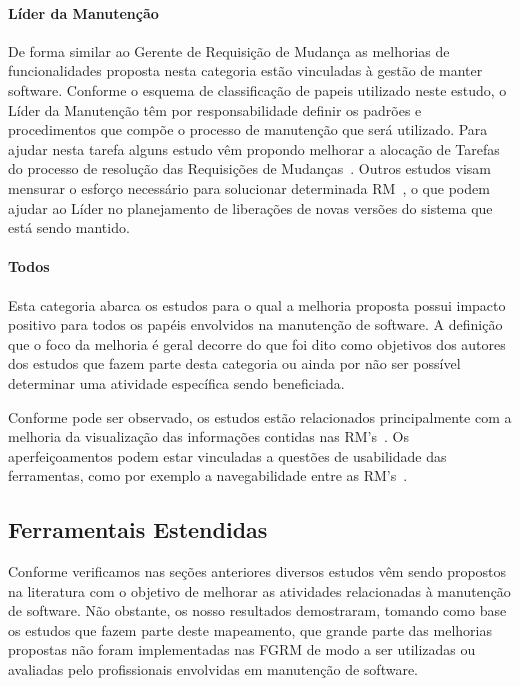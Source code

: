 \paragraph{Líder da Manutenção} De forma similar ao Gerente de Requisição de
Mudança as melhorias de funcionalidades proposta nesta categoria estão
vinculadas à gestão de manter software. Conforme o esquema de  classificação de
papeis utilizado neste estudo, o Líder da Manutenção têm por responsabilidade
definir os padrões e procedimentos que compõe o processo de manutenção que será
utilizado. Para ajudar nesta tarefa alguns estudo  vêm propondo melhorar a
alocação de Tarefas do processo de resolução das Requisições de
Mudanças~\cite{netto2010automated}.  Outros estudos visam mensurar o esforço
necessário para solucionar determinada RM~\cite{Vijayakumar2014, Nagwani2010}, o
que podem ajudar ao Líder no planejamento de liberações de novas versões do
sistema que está sendo mantido. 

\paragraph{Todos} Esta categoria abarca os estudos para o qual a melhoria
proposta possui impacto positivo para todos os papéis envolvidos na manutenção
de software. A definição que o foco da melhoria é geral decorre do que foi dito
como objetivos dos autores dos estudos que fazem parte desta categoria ou ainda
por não ser possível determinar uma atividade específica sendo beneficiada.

Conforme pode ser observado, os estudos estão relacionados principalmente com a
melhoria da  visualização das informações contidas nas RM's~\cite{hora2012bug,
	takama2013application, dal2014bug}. Os aperfeiçoamentos podem estar
vinculadas a questões de usabilidade das ferramentas, como por exemplo a
navegabilidade entre as RM's~\cite{dal2014bug}.

\subsection{Ferramentais Estendidas}
\label{sub:ferrramentas_extendidas}

Conforme verificamos nas seções anteriores diversos estudos vêm sendo propostos
na li\-te\-ra\-tu\-ra com o objetivo de melhorar as atividades relacionadas à
manutenção de software. Não obstante, os nosso resultados demostraram, tomando
como base os estudos que fazem parte deste mapeamento, que grande parte das
melhorias propostas não foram implementadas nas FGRM de modo a ser utilizadas ou
avaliadas pelo profissionais envolvidas em manutenção de software.

